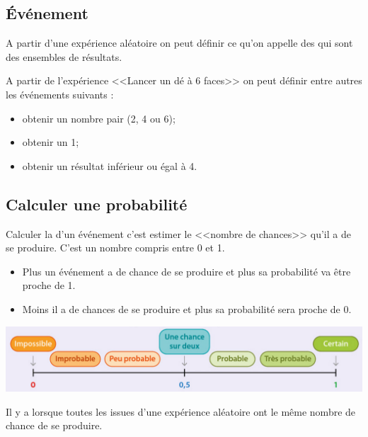 \documentclass[12pt,a4paper]{article}
\begin{document}
\subsection{\'Evénement}

\begin{mydef}
	A partir d'une expérience aléatoire on peut définir ce qu'on appelle des  qui sont des ensembles de résultats.
\end{mydef}

\begin{myex}
	A partir de l'expérience <<Lancer un dé à 6 faces>> on peut définir entre autres les événements suivants :
	\begin{itemize}
		\item obtenir un nombre pair (2, 4 ou 6);
		\item obtenir un 1;
		\item obtenir un résultat  inférieur ou égal à 4.
		
	\end{itemize}
\end{myex}

\subsection{Calculer une probabilité}

	\begin{mydef}
		Calculer la  d'un événement c'est estimer le <<nombre de chances>> qu'il a de se produire. C'est un nombre compris entre 0 et 1. 
		\begin{itemize}
			\item Plus un événement a de chance de se produire et plus sa probabilité va être proche de 1.
			\item Moins il a de chances de se produire et plus sa probabilité sera proche de 0.
		\end{itemize}
	
		\begin{center}
			\includegraphics[scale=0.5]{proba}
		\end{center}
	
		Il y a  lorsque toutes les issues d'une expérience aléatoire ont le même nombre de chance de se produire.
	\end{mydef}
\end{document}
